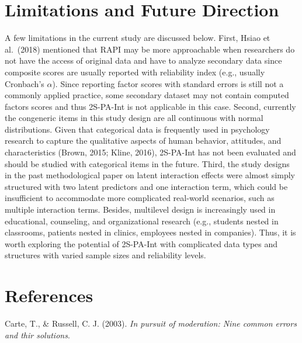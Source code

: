 \documentclass[
  man]{apa6}
\newlength{\cslhangindent}
\newlength{\cslentryspacingunit} %
\newenvironment{CSLReferences}[2] %
 {%
  \setlength{\parindent}{0pt}
  \ifodd #1
  \let\oldpar\par
  \def\par{\hangindent=\cslhangindent\oldpar}
  \fi
  \setlength{\parskip}{#2\cslentryspacingunit}
 }%
 {}
\begin{document}
\hypertarget{limitations-and-future-direction}{%
\section{Limitations and Future Direction}\label{limitations-and-future-direction}}

A few limitations in the current study are discussed below. First, Hsiao et al.~(2018) mentioned that RAPI may be more approachable when researchers do not have the access of original data and have to analyze secondary data since composite scores are usually reported with reliability index (e.g., usually Cronbach's \(\alpha\)). Since reporting factor scores with standard errors is still not a commonly applied practice, some secondary dataset may not contain computed factors scores and thus 2S-PA-Int is not applicable in this case. Second, currently the congeneric items in this study design are all continuous with normal distributions. Given that categorical data is frequently used in psychology research to capture the qualitative aspects of human behavior, attitudes, and characteristics (Brown, 2015; Kline, 2016), 2S-PA-Int has not been evaluated and should be studied with categorical items in the future. Third, the study designs in the past methodological paper on latent interaction effects were almost simply structured with two latent predictors and one interaction term, which could be insufficient to accommodate more complicated real-world scenarios, such as multiple interaction terms. Besides, multilevel design is increasingly used in educational, counseling, and organizational research (e.g., students nested in classrooms, patients nested in clinics, employees nested in companies). Thus, it is worth exploring the potential of 2S-PA-Int with complicated data types and structures with varied sample sizes and reliability levels.

\newpage

\hypertarget{references}{%
\section{References}\label{references}}

\hypertarget{refs}{}
\begin{CSLReferences}{1}{0}
\leavevmode{}%
Carte, T., \& Russell, C. J. (2003). \emph{{In pursuit of moderation}: {Nine common errors and thir solutions}}.

\end{CSLReferences}
\end{document}
